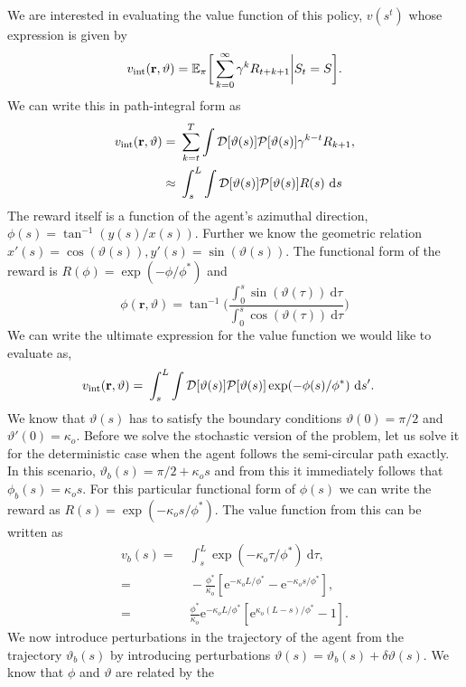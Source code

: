 \documentclass[%
reprint,
superscriptaddress,
floatfix,
amsmath,
amssymb,
aps,
notitlepage
]{revtex4-1}
\def\d{\text{d}}
\def\e{\text{e}}
\def\r{\mathbf{r}}
\def\E{\mathbb{E}}
\def\P{\mathcal{P}}
\def\D{\mathcal{D}}
\def\theta{\vartheta}
\begin{document}
We are interested in evaluating the value function of this policy, $v(s^t)$ whose
expression is given by
\[
    v_{\rm int}(\r, \theta) = \E_\pi \bigg[ \sum_{k=0}^\infty \gamma^k R_{t+k+1} \bigg| S_t = S \bigg].
\]
We can write this in path-integral form as
\begin{align}
    v_{\rm int}(\r, \theta) =& \ \sum_{k=t}^T \int \D[\theta(s)] \P[\theta(s)] \gamma^{k-t} R_{k+1}, \\
    \approx& \ \int_{s}^L \int \D[\theta(s)] \P[\theta(s)] R(s) \ \d s
\end{align}
The reward itself is a function of the agent's azimuthal direction, $\phi(s) = \tan^{-1}(y(s)/x(s))$.
Further we know the geometric relation $x'(s) = \cos(\theta(s)), y'(s) = \sin(\theta(s))$. The functional
form of the reward is $R(\phi) = \exp(-\phi/\phi^*)$ and 
\[
    \phi(\r, \theta) = \tan^{-1}\bigg( \frac{\int_0^s \sin(\theta(\tau)) \ \d \tau}{\int_0^s \cos(\theta(\tau)) \ \d \tau} \bigg)
\]
We can write the ultimate expression for the value function we would like to evaluate as,
\begin{align}
    v_{\rm int}(\r, \theta) =& \ \int_{s}^L \int \D[\theta(s)] \P[\theta(s)] \exp(-\phi(s)/\phi^*) \ \d s'.
\end{align}
We know that $\theta(s)$ has to satisfy the boundary conditions $\theta(0) = \pi/2$ and $\theta'(0) = \kappa_o$.
Before we solve the stochastic version of the problem, let us solve it for the deterministic case when
the agent follows the semi-circular path exactly. In this scenario, $\theta_b(s) = \pi/2 + \kappa_o s$ and
from this it immediately follows that $\phi_b(s) = \kappa_o s$. For this particular functional form of $\phi(s)$
we can write the reward as $R(s) = \exp(-\kappa_o s/\phi^*)$. The value function from this can be written as
\begin{align}
    v_b(s) =& \ \int_s^L \exp(-\kappa_o \tau/\phi^*) \ \d \tau, \\
    =& \ -\frac{\phi^*}{\kappa_o} [\e^{-\kappa_o L/\phi^*} - \e^{-\kappa_o s/\phi^*}], \\
    =& \ \frac{\phi^*}{\kappa_o} \e^{-\kappa_o L/\phi^*} [ \e^{\kappa_o(L-s)/\phi^*} - 1].
\end{align}
We now introduce perturbations in the trajectory of the agent from the trajectory $\theta_b(s)$ by introducing
perturbations $\theta(s) = \theta_b(s) + \delta \theta(s)$. We know that $\phi$ and $\theta$ are related by the
\end{document}
